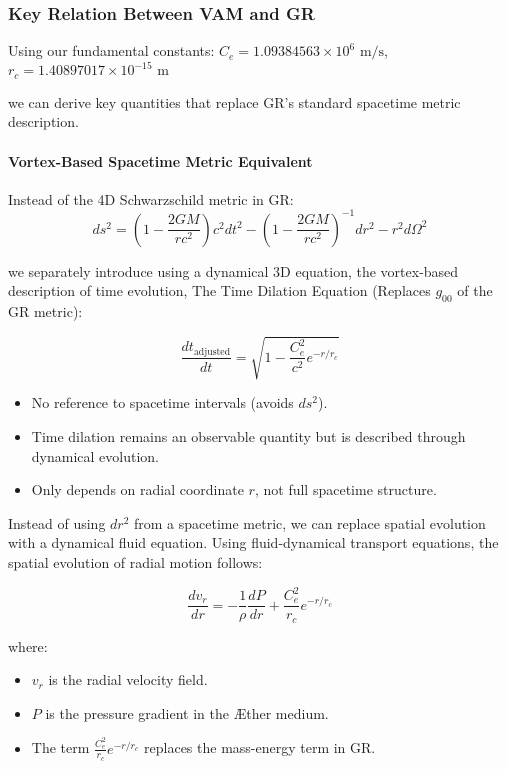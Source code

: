 \subsubsection*{Key Relation Between VAM and GR}
Using our fundamental constants:
$C_e = 1.09384563 \times 10^6 \text{ m/s}$, $r_c = 1.40897017 \times 10^{-15} \text{ m}$

we can derive key quantities that replace GR's standard spacetime metric description.

\paragraph{Vortex-Based Spacetime Metric Equivalent}
Instead of the 4D Schwarzschild metric in GR:
\begin{equation*}
    ds^2 = \left( 1 - \frac{2GM}{rc^2} \right) c^2 dt^2 - \left( 1 - \frac{2GM}{rc^2} \right)^{-1} dr^2 - r^2 d\Omega^2
\end{equation*}

we separately introduce using a dynamical 3D equation, the vortex-based description of time evolution,
The Time Dilation Equation (Replaces $g_{00}$ of the GR metric):

\begin{equation*}
    \boxed{\frac{d t_\text{adjusted}}{d t} = \sqrt{1 - \frac{C_e^2}{c^2} e^{-r/r_c}}}
\end{equation*}


\begin{itemize}
\item No reference to spacetime intervals (avoids $ ds^2 $).
\item Time dilation remains an observable quantity but is described through dynamical evolution.
\item Only depends on radial coordinate $r$, not full spacetime structure.
\end{itemize}


Instead of using $ dr^2 $ from a spacetime metric, we can replace spatial evolution with a dynamical fluid equation. Using fluid-dynamical transport equations, the spatial evolution of radial motion follows:

\begin{equation*}
    \frac{d v_r}{d r} = - \frac{1}{\rho} \frac{d P}{d r} + \frac{C_e^2}{r_c} e^{-r/r_c}
\end{equation*}

where:

\begin{itemize}
\item $v_r$ is the radial velocity field.
\item $P$ is the pressure gradient in the Æther medium.
\item The term  $\frac{C_e^2}{r_c} e^{-r/r_c}$ replaces the mass-energy term in GR.
\end{itemize}

